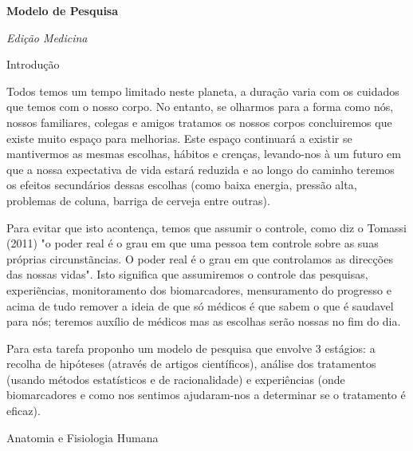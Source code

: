 \documentclass[12pt]{article}
\begin{document}
 

\begin{titlepage}
    \begin{center}
        \Huge\textbf{Modelo de Pesquisa}
         
        \Large\textit{Edi\c c\~ao Medicina}
         
        \vspace{10cm}
    \end{center}
\end{titlepage}

\begin{center}
    \Huge{Introdu\c c\~ao}
\end{center}

\justifying
Todos temos um tempo limitado neste planeta, a dura\c c\~ao varia com os
cuidados que temos com o nosso corpo. No entanto, se olharmos para a forma como
n\'os, nossos familiares, colegas e amigos tratamos os nossos corpos
concluiremos que existe muito espa\c co para melhorias. Este espa\c co
continuar\'a a existir se mantivermos as mesmas escolhas, h\'abitos e cren\c
cas,  levando-nos \`a um futuro em que a nossa expectativa de vida estar\'a
reduzida e ao longo do caminho teremos os efeitos secund\'arios dessas escolhas
(como baixa energia, press\~ao alta, problemas de coluna, barriga de cerveja
entre outras).

Para evitar que isto aconten\c ca,  temos que assumir o controle, como diz o
Tomassi (2011) "o poder real \'e o grau em que uma pessoa tem controle sobre as
suas pr\'oprias circunst\~ancias. O poder real \'e o grau em que controlamos as
direc\c c\~oes das nossas vidas". Isto significa que assumiremos o controle das
pesquisas, experi\~encias, monitoramento dos biomarcadores, mensuramento do
progresso e acima de tudo remover a ideia de que s\'o m\'edicos \'e que
sabem o que \'e saudavel para n\'os; teremos aux\'ilio de m\'edicos mas as
escolhas ser\~ao nossas no fim do dia. 

Para esta tarefa proponho um modelo de pesquisa que envolve 3 est\'agios: a
recolha de hip\'oteses (atrav\'es de artigos cient\'ificos), an\'alise dos
tratamentos (usando m\'etodos estat\'isticos e de racionalidade) e
experi\^encias (onde biomarcadores e como nos sentimos ajudaram-nos a
determinar se o tratamento \'e eficaz). 
\pagebreak


\begin{center}
    \Huge{Anatomia e Fisiologia Humana}
\end{center}
\end{document}
